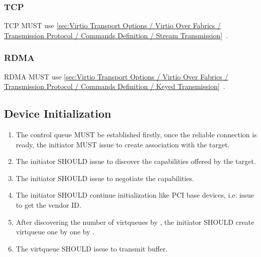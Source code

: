 \subsubsection{TCP}\label{sec:Virtio Transport Options / Virtio Over Fabrics / ransport Binding / TCP}
TCP MUST use \ref{sec:Virtio Transport Options / Virtio Over Fabrics / Transmission Protocol / Commands Definition / Stream Transmission}~.

\subsubsection{RDMA}\label{sec:Virtio Transport Options / Virtio Over Fabrics / ransport Binding / RDMA}
RDMA MUST use \ref{sec:Virtio Transport Options / Virtio Over Fabrics / Transmission Protocol / Commands Definition / Keyed Transmission}~.

\subsection{Device Initialization}\label{sec:Virtio Transport Options / Virtio Over Fabrics / Device Initialization}
\begin{enumerate}
\item The control queue MUST be established firstly, once the reliable connection is ready, the initiator MUST issue  to create association with the target.
\item The initiator SHOULD issue  to discover the capabilities offered by the target.
\item The initiator SHOULD issue  to negotiate the capabilities.
\item The initiator SHOULD continue initialization like PCI base devices, i.e. issue  to get the vendor ID.
\item After discovering the number of virtqueues by , the initiator SHOULD create virtqueue one by one by .
\item The virtqueue SHOULD issue  to transmit buffer.
\end{enumerate}
